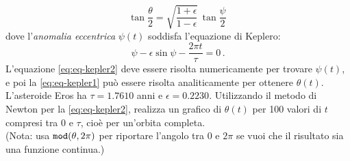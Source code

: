\documentclass[letterpaper, 12pt]{article}
\numberwithin{equation}{section}    %
\begin{document}
\begin{equation}
    \label{eq:eq-kepler1}
    \tan \frac{\theta}{2} = \sqrt{\frac{1+\epsilon}{1-\epsilon}}\,
    \tan \frac{\psi}{2}\,
\end{equation}
dove l'\textit{anomalia eccentrica} $\psi(t)$ soddisfa l'equazione di Keplero:
\begin{equation}
    \label{eq:eq-kepler2}
    \psi - \epsilon \sin \psi - \frac{2\pi t}{\tau} = 0\,.
\end{equation}
L'equazione \ref{eq:eq-kepler2} deve essere risolta numericamente per trovare $\psi(t)$, 
e poi la \ref{eq:eq-kepler1} può essere risolta analiticamente per ottenere $\theta(t)$.
L'asteroide Eros ha $\tau=1.7610$ anni e $\epsilon=0.2230$. Utilizzando il metodo di Newton per la \ref{eq:eq-kepler2}, 
realizza un grafico di $\theta(t)$ per 100 valori di $t$ compresi tra $0$ e $\tau$, cioè per un'orbita completa.\\
(Nota: usa $\verb|mod|(\theta,2\pi)$ per riportare l'angolo tra 0 e $2\pi$ se vuoi che il risultato 
sia una funzione continua.)
\end{document}

